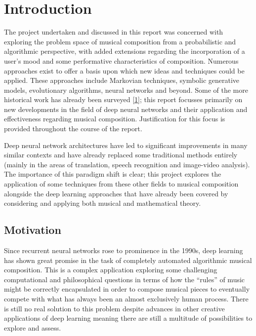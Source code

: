 \documentclass[12pt,]{article}
\begin{document}

\hypertarget{introduction}{%
\section{Introduction}\label{introduction}}

The project undertaken and discussed in this report was concerned with
exploring the problem space of musical composition from a probabilistic
and algorithmic perspective, with added extensions regarding the
incorporation of a user's mood and some performative characteristics of
composition. Numerous approaches exist to offer a basis upon which new
ideas and techniques could be applied. These approaches include
Markovian techniques, symbolic generative models, evolutionary
algorithms, neural networks and beyond. Some of the more historical work
has already been surveyed
{[}\protect\hyperlink{ref-nierhaus2009algorithmic}{1}{]}; this report
focusses primarily on new developments in the field of deep neural
networks and their application and effectiveness regarding musical
composition. Justification for this focus is provided throughout the
course of the report.

Deep neural network architectures have led to significant improvements
in many similar contexts and have already replaced some traditional
methods entirely (mainly in the areas of translation, speech recognition
and image-video analysis). The importance of this paradigm shift is
clear; this project explores the application of some techniques from
these other fields to musical composition alongside the deep learning
approaches that have already been covered by considering and applying
both musical and mathematical theory.

\hypertarget{motivation}{%
\subsection{Motivation}\label{motivation}}

Since recurrent neural networks rose to prominence in the 1990s, deep
learning has shown great promise in the task of completely automated
algorithmic musical composition. This is a complex application exploring
some challenging computational and philosophical questions in terms of
how the ``rules'' of music might be correctly encapsulated in order to
compose musical pieces to eventually compete with what has always been
an almost exclusively human process. There is still no real solution to
this problem despite advances in other creative applications of deep
learning meaning there are still a multitude of possibilities to explore
and assess.
\end{document}
